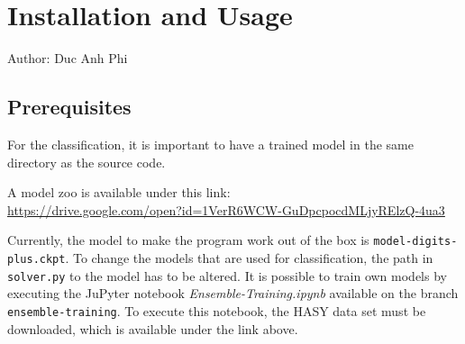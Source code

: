 \documentclass[11pt]{article}
\begin{document}

	
	
	\pagebreak
	\section{Installation and Usage}
	\small{Author: Duc Anh Phi}\\
	\subsection{Prerequisites}
	For the classification, it is important to have a trained model in the same directory as the source code.
	
	A model zoo is available under this link: \\
	\url{https://drive.google.com/open?id=1VerR6WCW-GuDpcpocdMLjyRElzQ-4ua3}
	
	Currently, the model to make the program work out of the box is \texttt{model-digits-plus.ckpt}. To change the models that are used for classification, the path in \texttt{solver.py} to the model has to be altered.
	It is possible to train own models by executing the JuPyter notebook \textit{Ensemble-Training.ipynb} available on the branch \texttt{ensemble-training}. To execute this notebook, the HASY data set must be downloaded, which is available under the link above. 
\end{document}
